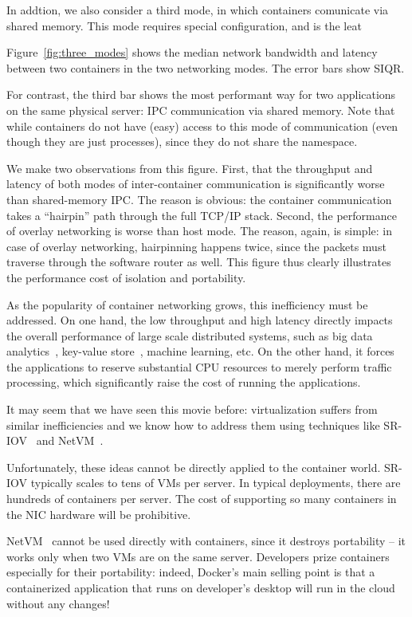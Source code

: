 In addtion, we also consider a third mode, in which containers comunicate via
shared memory. This mode requires special configuration, and is the leat

Figure~\ref{fig:three_modes} shows the median network bandwidth and latency
between two containers in the two networking modes. The error bars show SIQR.

For contrast, the third bar shows the most performant way for two applications
on the same physical server: IPC communication via shared memory.  Note that
while containers do not have (easy) access to this mode of communication (even
though they are just processes), since they do not share the namespace.

We make two observations from this figure. First, that the throughput and
latency of both modes of inter-container communication is significantly worse
than shared-memory IPC. The reason is obvious: the container communication takes
a ``hairpin'' path through the full TCP/IP stack. Second,
the performance of overlay networking is worse than host mode. The reason, again,
is simple: in case of overlay networking, hairpinning happens twice, since the
packets must traverse through the software router as well. This figure thus
clearly illustrates the performance cost of isolation and portability.

As the popularity of container networking grows, this inefficiency must be
addressed. On one hand, the low throughput and high latency directly impacts
the overall performance of large scale distributed systems, such as big data
analytics~\cite{choudhury-paper}, key-value store~\cite{farm}, machine learning,
etc.  On the other hand, it forces the applications to reserve substantial CPU
resources to merely perform traffic processing, which significantly raise the
cost of running the applications.

It may seem that we have seen this movie before: virtualization suffers from
similar inefficiencies and we know how to address them using techniques like
SR-IOV~\cite{sriov} and NetVM~\cite{netvm}.

Unfortunately, these ideas cannot be directly applied to the container world.
SR-IOV typically scales to tens of VMs per server. In typical deployments, there
are hundreds of containers per server. The cost of supporting so many containers
in the NIC hardware will be prohibitive. 

NetVM~\cite{netvm} cannot be used directly with containers, since it destroys
portability -- it works only when two VMs are on the same server.
Developers prize containers especially for their portability: indeed, Docker's
main selling point is that a containerized application that runs on developer's
desktop will run in the cloud without any changes! 

